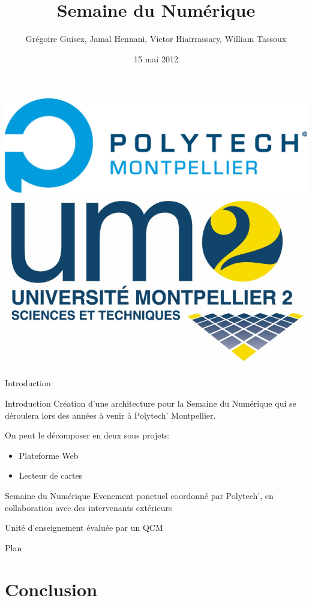 \documentclass[handout]{beamer}
\title{Semaine du Numérique}
\author[G. Guisez, J. Hennani, V. Hiairrassary, W. Tassoux]{Grégoire Guisez, Jamal Hennani, Victor Hiairrassary, William Tassoux}
\institute{Polytech' Montpellier, Université Montpellier 2}
\date{15 mai 2012}
\begin{document}
\small 



\begin{frame}
    \titlepage

    \includegraphics[scale=0.2]{images/logoPolytech.jpg}
    \hfill
    \hskip8pt
    \includegraphics[scale=0.05]{images/logoUm2.jpg}
\end{frame}


\begin{frame}{Introduction}
    \begin{block}{Introduction}
 		 Création d'une architecture pour la Semaine du Numérique qui se déroulera lors des années à venir à Polytech' Montpellier.

		 On peut le décomposer en deux sous projets:
		\begin{itemize}
			\item Plateforme Web
			\item Lecteur de cartes
		\end{itemize}
	\end{block}

	\begin{block}{Semaine du Numérique}
    Evenement ponctuel coordonné par Polytech', en collaboration avec des intervenants extérieurs
    
    Unité d'enseignement évaluée par un QCM
	\end{block}	
\end{frame}

\begin{frame}{Plan}
 	\tableofcontents
\end{frame}






\section{Conclusion}

\end{document}
